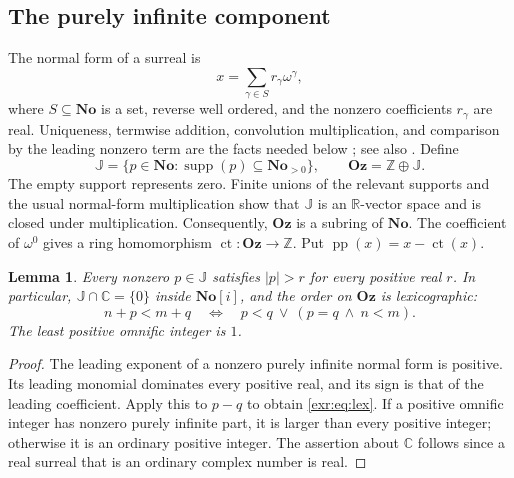\documentclass[11pt,letterpaper]{article}
\numberwithin{equation}{section}
\newtheorem{lemma}[lemma]{Lemma}
\theoremstyle{definition}
\theoremstyle{remark}
\newcommand{\No}{\mathbf{No}}
\newcommand{\Oz}{\mathbf{Oz}}
\newcommand{\SC}{\mathbf{No}[i]}
\newcommand{\Z}{\mathbb Z}
\newcommand{\R}{\mathbb R}
\newcommand{\C}{\mathbb C}
\newcommand{\J}{\mathbb J}
\newcommand{\ct}{\operatorname{ct}}
\newcommand{\pp}{\operatorname{pp}}
\newcommand{\supp}{\operatorname{supp}}
\begin{document}
\subsection{The purely infinite component}
The normal form of a surreal is
\begin{equation}\label{exr:eq:normal}
 x=\sum_{\gamma\in S}r_\gamma\omega^\gamma,
\end{equation}
where $S\subseteq\No$ is a set, reverse well ordered, and the nonzero coefficients
$r_\gamma$ are real. Uniqueness, termwise addition, convolution multiplication, and
comparison by the leading nonzero term are the facts needed below
\cite[Chapter~5]{gonshor}; see also \cite[Theorem~2.10]{mantova}.
Define
\begin{equation}
 \J=\{p\in\No:\supp(p)\subseteq\No_{>0}\},\qquad \Oz=\Z\oplus\J.
\end{equation}
The empty support represents zero. Finite unions of the relevant supports and the
usual normal-form multiplication show that $\J$ is an $\R$-vector space and is
closed under multiplication. Consequently, $\Oz$ is a subring of $\No$.
The coefficient of $\omega^0$ gives a ring homomorphism $\ct:\Oz\to\Z$.
Put $\pp(x)=x-\ct(x)$.

\begin{lemma}\label{exr:lem:basic}
Every nonzero $p\in\J$ satisfies $|p|>r$ for every positive real $r$. In particular,
$\J\cap\C=\{0\}$ inside $\SC$, and the order on $\Oz$ is lexicographic:
\begin{equation}\label{exr:eq:lex}
 n+p<m+q\quad\Longleftrightarrow\quad
 p<q\ \lor\ (p=q\ \land\ n<m).
\end{equation}
The least positive omnific integer is $1$.
\end{lemma}
\begin{proof}
The leading exponent of a nonzero purely infinite normal form is positive. Its
leading monomial dominates every positive real, and its sign is that of the
leading coefficient. Apply this to $p-q$ to obtain \eqref{exr:eq:lex}. If a positive
omnific integer has nonzero purely infinite part, it is larger than every positive
integer; otherwise it is an ordinary positive integer. The assertion about $\C$
follows since a real surreal that is an ordinary complex number is real.
\end{proof}
\end{document}
